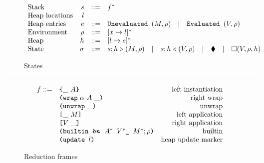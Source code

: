 
\begin{figure*}[!ht]
\caption{The L Machine}
\begin{subfigure}[c]{\linewidth}   %
{\small
\caption{States}
\[
\begin{array}{lrcl}
        \textrm{Stack}          & s      & ::= & f^*\\
        \textrm{Heap locations} & l      &  & \\
        \textrm{Heap entries}   & e      & ::= & \texttt{Unevaluated } (M, \rho)\quad|\quad\texttt{Evaluated } (V,\rho) \\
        \textrm{Environment}    & \rho   & ::= & [x \mapsto l]^*\\
        \textrm{Heap}           & h      & ::= & [l \mapsto e]^*\\
        \textrm{State}          & \sigma & ::= & s;h \mathrel\triangleright (M,\rho) \quad| \quad s;h \mathrel\triangleleft (V, \rho)  \quad| \quad \blacklozenge{} \quad|\quad \square (V,\rho,h)
    \end{array}
\]
}
\end{subfigure}

\vspace{2mm}
\hrule
\vspace{2.5mm}

\begin{subfigure}[c]{\linewidth}     %
{
\small
\caption{Reduction frames}
\[
    \begin{array}{rlr}
      f :: = & \texttt{\{}\_ ~ A\texttt{\}}                     & \textrm{left instantiation}\\
             & \texttt{(} \texttt{wrap} ~ \alpha ~ A ~ \_ \texttt{)}            & \textrm{right wrap}\\
             & \texttt{(} \texttt{unwrap} ~ \_ \texttt{)}{}                        & \textrm{unwrap}\\
             & \texttt{[} \_ ~ M \texttt{]}                      & \textrm{left application}\\
             & \texttt{[} V ~ \_ \texttt{]}                     & \textrm{right application}\\
             & \texttt{(builtin \textit{bn} $A^*\ V^*\_\ M^*; \rho$)}        & \textrm{builtin}\\
             & \texttt{(update\ $l$)}                   & \textrm{heap update marker}\\
    \end{array}
\]
}
\end{subfigure}
\end{figure*}

